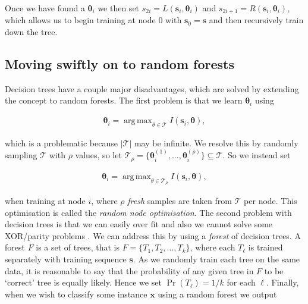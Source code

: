 \documentclass[12pt,twoside,notitlepage]{report}
\newcommand{\vc}[1]{\mathbf{#1}}
\newcommand{\cl}[1]{\mathcal{#1}}
\DeclareMathOperator*{\argmax}{arg\,max}
\begin{document}
            Once we have found a $\vc{\theta}_i$ we then set $s_{2i} = L(\vc{s}_i, \vc{\theta}_i)$ and 
            $s_{2i+1} = R(\vc{s}_i, \vc{\theta}_i)$, which allows us to begin training at node $0$ with $\vc{s}_0 = \vc{s}$ 
            and then recursively train down the tree. \cite{criminisi2013decision}


        \subsection{Moving swiftly on to random forests} \label{sec:moving_swiftly_onto_forests}
            Decision trees have a couple major disadvantages, which are solved by extending the concept to random 
            forests. The first problem is that we learn $\vc{\theta}_i$ using

            \begin{align} 
                \vc{\theta}_i = \argmax_{\theta\in\cl{T}} I(\vc{s}_i, \vc{\theta}),
            \end{align}

            which is a problematic because $|\cl{T}|$ may be infinite. We resolve this by randomly sampling $\cl{T}$ with 
            $\rho$ values, so let $\cl{T}_\rho = \{ \vc{\theta}_i^{(1)}, ..., \vc{\theta}_i^{(\rho)} \} \subseteq \cl{T}$.
            So we instead set 

            \begin{align} 
                \vc{\theta}_i = \argmax_{\theta\in\cl{T}_\rho} I(\vc{s}_i, \vc{\theta}),
            \end{align}            

            when training at node $i$, where $\rho$ \textit{fresh} samples are taken from $\cl{T}$ per node. This 
            optimisation is called the \textit{random node optimisation}. The second problem with decision trees is that 
            we can easily over fit and also we cannot solve some XOR/parity problems \cite{criminisi2013decision}. We 
            can address this by using a \textit{forest} of decision trees. A forest $F$ is a set of trees, 
            that is $F = \{ T_1, T_2, ..., T_k \}$, where each $T_\ell$ is trained separately with training sequence 
            $\vc{s}$. As we randomly train each tree on the same data, it is reasonable to say that the probability of 
            any given tree in $F$ to be `correct' tree is equally likely. Hence we set $\Pr(T_\ell) = 1/k$ for each 
            $\ell$. Finally, when we wish to classify some instance $\vc{x}$ using a random forest we output 
\end{document}
